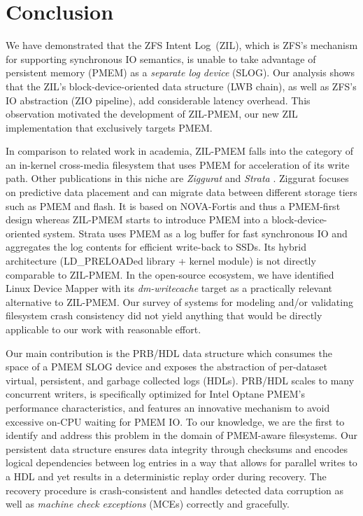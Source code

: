 \documentclass[12pt,a4paper,twoside]{book}
\begin{document}
{\chapter{Conclusion}\label{ch:conclusion}

We have demonstrated that the ZFS Intent Log~(ZIL), which is ZFS's mechanism for supporting synchronous IO semantics, is unable to take advantage of persistent memory (PMEM) as a \textit{separate log device} (SLOG).
Our analysis shows that the ZIL's block-device-oriented data structure (LWB chain), as well as ZFS's IO abstraction (ZIO pipeline), add considerable latency overhead.
This observation motivated the development of ZIL-PMEM, our new ZIL implementation that exclusively targets PMEM.

In comparison to related work in academia, ZIL-PMEM falls into the category of an in-kernel cross-media filesystem that uses PMEM for acceleration of its write path.
Other publications in this niche are \textit{Ziggurat} and \textit{Strata} \cite{zhengZigguratTieredFile2019,kwonStrataCrossMedia2017}.
Ziggurat focuses on predictive data placement and can migrate data between different storage tiers such as PMEM and flash.
It is based on NOVA-Fortis and thus a PMEM-first design whereas ZIL-PMEM starts to introduce PMEM into a block-device-oriented system.
Strata uses PMEM as a log buffer for fast synchronous IO and aggregates the log contents for efficient write-back to SSDs.
Its hybrid architecture (LD\_PRELOADed library + kernel module) is not directly comparable to ZIL-PMEM.
In the open-source ecosystem, we have identified Linux Device Mapper with its \textit{dm-writecache} target as a practically relevant alternative to \mbox{ZIL-PMEM}.
Our survey of systems for modeling and/or validating filesystem crash consistency did not yield anything that would be directly applicable to our work with reasonable effort.

Our main contribution is the PRB/HDL data structure which consumes the space of a PMEM SLOG device and exposes the abstraction of per-dataset virtual, persistent, and garbage collected logs (HDLs).
PRB/HDL scales to many concurrent writers, is specifically optimized for Intel Optane PMEM's performance characteristics, and features an innovative mechanism to avoid excessive on-CPU waiting for PMEM IO.
To our knowledge, we are the first to identify and address this problem in the domain of PMEM-aware filesystems.
Our persistent data structure ensures data integrity through checksums and encodes logical dependencies between log entries in a way that allows for parallel writes to a HDL and yet results in a deterministic replay order during recovery.
The recovery procedure is crash-consistent and handles detected data corruption as well as \textit{machine check exceptions} (MCEs) correctly and gracefully.

}
\end{document}
